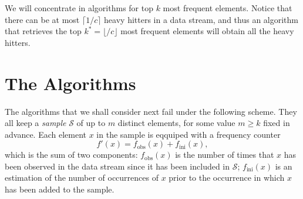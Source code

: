 \documentclass{article}
\begin{document}
We will concentrate in algorithms for
top $k$ most frequent elements. Notice that there can be at most
$\lceil 1/c\rceil$ heavy hitters in a data stream, and thus an algorithm
that retrieves the top $k^\ast=\lfloor/c\rfloor$ most frequent elements will
obtain all the heavy hitters.


\section{The Algorithms}
The algorithms that we shall consider next fail under the following
scheme.  They all keep a \emph{sample} $\mathcal{S}$ of up to $m$
distinct elements, for some value $m\ge k$ fixed in advance. Each element
$x$ in the sample is eqquiped with a frequency counter
\[
f'(x) = f_\text{obs}(x) + f_\text{ini}(x),
\]
which is the sum of two components: $f_\text{obs}(x)$ is the number of
times that $x$ has been observed in the data stream since it has been included
in $\mathcal{S}$; $f_\text{ini}(x)$ is an estimation of the number of
occurrences of $x$ prior to the occurrence in which $x$ has been added
to the sample.
\end{document}
